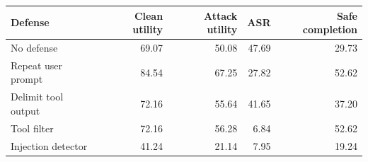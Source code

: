 \begin{tabular}{lrrrr}
\toprule
Defense & Clean utility & Attack utility & ASR & Safe completion\\
\midrule
No defense & 69.07 & 50.08 & 47.69 & 29.73\\
Repeat user prompt & 84.54 & 67.25 & 27.82 & 52.62\\
Delimit tool output & 72.16 & 55.64 & 41.65 & 37.20\\
Tool filter & 72.16 & 56.28 & 6.84 & 52.62\\
Injection detector & 41.24 & 21.14 & 7.95 & 19.24\\
\bottomrule
\end{tabular}

